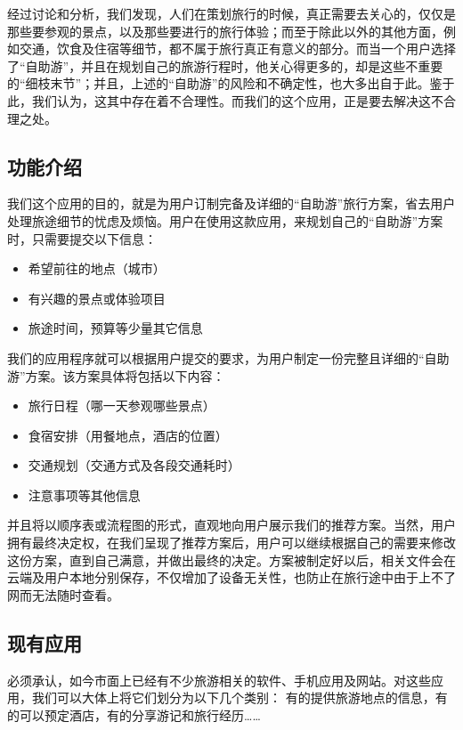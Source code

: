 \documentclass[12pt,a4paper]{article}
\begin{document}
\begin{CJK}{UTF8}{gbsn}
	经过讨论和分析，我们发现，人们在策划旅行的时候，真正需要去关心的，仅仅是那些要参观的景点，以及那些要进行的旅行体验；而至于除此以外的其他方面，例如交通，饮食及住宿等细节\footnotemark，都不属于旅行真正有意义的部分。而当一个用户选择了“自助游”，并且在规划自己的旅游行程时，他关心得更多的，却是这些不重要的“细枝末节”；并且，上述的“自助游”的风险和不确定性，也大多出自于此。鉴于此，我们认为，这其中存在着不合理性。而我们的这个应用，正是要去解决这不合理之处。


	\subsection{功能介绍}
	我们这个应用的目的，就是为用户订制完备及详细的“自助游”旅行方案，省去用户处理旅途细节的忧虑及烦恼。用户在使用这款应用，来规划自己的“自助游”方案时，只需要提交以下信息：
	\begin{itemize}
	\item 希望前往的地点（城市）
	\item 有兴趣的景点或体验项目
	\item 旅途时间，预算等少量其它信息
	\end{itemize}
	我们的应用程序就可以根据用户提交的要求，为用户制定一份完整且详细的“自助游”方案。该方案具体将包括以下内容：
	\begin{itemize}
	\item 旅行日程（哪一天参观哪些景点）
	\item 食宿安排（用餐地点，酒店的位置）
	\item 交通规划（交通方式及各段交通耗时）
	\item 注意事项等其他信息
	\end{itemize}
	并且将以顺序表或流程图的形式，直观地向用户展示我们的推荐方案。当然，用户拥有最终决定权，在我们呈现了推荐方案后，用户可以继续根据自己的需要来修改这份方案，直到自己满意，并做出最终的决定。方案被制定好以后，相关文件会在云端及用户本地分别保存，不仅增加了设备无关性，也防止在旅行途中由于上不了网而无法随时查看。
	
	\subsection{现有应用}
	必须承认，如今市面上已经有不少旅游相关的软件、手机应用及网站。对这些应用，我们可以大体上将它们划分为以下几个类别：
	有的提供旅游地点的信息，有的可以预定酒店，有的分享游记和旅行经历……


\end{CJK}
\end{document}

